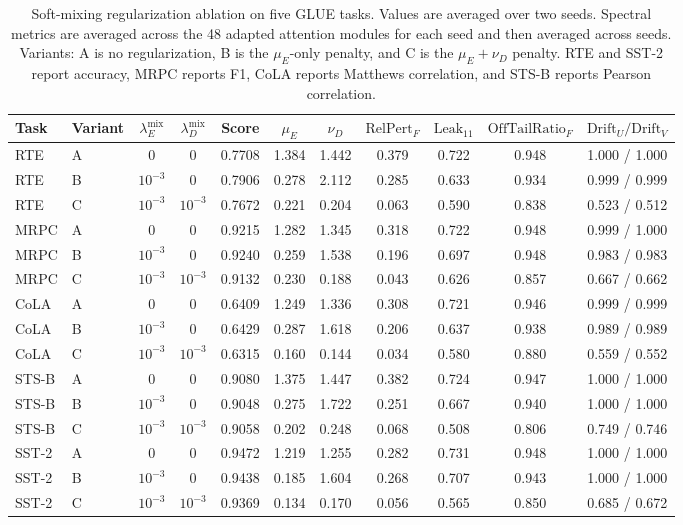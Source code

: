 \documentclass{article}
\begin{document}
\begin{table}[h]
\centering
\caption{Soft-mixing regularization ablation on five GLUE tasks. Values are
averaged over two seeds. Spectral metrics are averaged across the 48 adapted
attention modules for each seed and then averaged across seeds. Variants: A is
no regularization, B is the \(\mu_E\)-only penalty, and C is the
\(\mu_E+\nu_D\) penalty. RTE and SST-2 report accuracy, MRPC reports F1, CoLA
reports Matthews correlation, and STS-B reports Pearson correlation.}
\label{tab:soft_mixing_ablation}
\begin{adjustbox}{max width=\linewidth}
\begin{tabular}{llccccccccc}
\toprule
\textbf{Task} &
\textbf{Variant} &
\(\lambda_E^{\mathrm{mix}}\) &
\(\lambda_D^{\mathrm{mix}}\) &
\textbf{Score} &
\(\mu_E\) &
\(\nu_D\) &
\(\mathrm{RelPert}_F\) &
\(\mathrm{Leak}_{11}\) &
\(\mathrm{OffTailRatio}_F\) &
\(\mathrm{Drift}_U / \mathrm{Drift}_V\) \\
\midrule
RTE   & A & 0 & 0 & 0.7708 & 1.384 & 1.442 & 0.379 & 0.722 & 0.948 & 1.000 / 1.000 \\
RTE   & B & \(10^{-3}\) & 0 & 0.7906 & 0.278 & 2.112 & 0.285 & 0.633 & 0.934 & 0.999 / 0.999 \\
RTE   & C & \(10^{-3}\) & \(10^{-3}\) & 0.7672 & 0.221 & 0.204 & 0.063 & 0.590 & 0.838 & 0.523 / 0.512 \\
\midrule
MRPC  & A & 0 & 0 & 0.9215 & 1.282 & 1.345 & 0.318 & 0.722 & 0.948 & 0.999 / 1.000 \\
MRPC  & B & \(10^{-3}\) & 0 & 0.9240 & 0.259 & 1.538 & 0.196 & 0.697 & 0.948 & 0.983 / 0.983 \\
MRPC  & C & \(10^{-3}\) & \(10^{-3}\) & 0.9132 & 0.230 & 0.188 & 0.043 & 0.626 & 0.857 & 0.667 / 0.662 \\
\midrule
CoLA  & A & 0 & 0 & 0.6409 & 1.249 & 1.336 & 0.308 & 0.721 & 0.946 & 0.999 / 0.999 \\
CoLA  & B & \(10^{-3}\) & 0 & 0.6429 & 0.287 & 1.618 & 0.206 & 0.637 & 0.938 & 0.989 / 0.989 \\
CoLA  & C & \(10^{-3}\) & \(10^{-3}\) & 0.6315 & 0.160 & 0.144 & 0.034 & 0.580 & 0.880 & 0.559 / 0.552 \\
\midrule
STS-B & A & 0 & 0 & 0.9080 & 1.375 & 1.447 & 0.382 & 0.724 & 0.947 & 1.000 / 1.000 \\
STS-B & B & \(10^{-3}\) & 0 & 0.9048 & 0.275 & 1.722 & 0.251 & 0.667 & 0.940 & 1.000 / 1.000 \\
STS-B & C & \(10^{-3}\) & \(10^{-3}\) & 0.9058 & 0.202 & 0.248 & 0.068 & 0.508 & 0.806 & 0.749 / 0.746 \\
\midrule
SST-2 & A & 0 & 0 & 0.9472 & 1.219 & 1.255 & 0.282 & 0.731 & 0.948 & 1.000 / 1.000 \\
SST-2 & B & \(10^{-3}\) & 0 & 0.9438 & 0.185 & 1.604 & 0.268 & 0.707 & 0.943 & 1.000 / 1.000 \\
SST-2 & C & \(10^{-3}\) & \(10^{-3}\) & 0.9369 & 0.134 & 0.170 & 0.056 & 0.565 & 0.850 & 0.685 / 0.672 \\
\bottomrule
\end{tabular}
\end{adjustbox}
\end{table}
\end{document}
